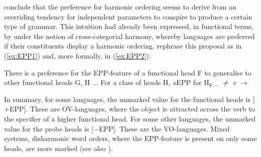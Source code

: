 \documentclass[output=paper]{langscibook}
\begin{document}
\citet{RobertsHolmberg2010} conclude that the preference for harmonic ordering seems to derive from an overriding tendency for independent parameters to conspire to produce a certain type of grammar. This intuition had already been expressed, in functional terms, by \citet{Hawkins1983} under the notion of cross-categorial harmony, whereby languages are preferred if their constituents display a harmonic ordering. \citet[39--40]{RobertsHolmberg2010} rephrase this proposal as in (\ref{ex:EPP1}) and, more formally, in (\ref{ex:EPP2}):
\begin{exe}
\ex \begin{xlist}
\ex There is a preference for the EPP-feature of a functional head F to generalise to other functional heads G, H ...\label{ex:EPP1}
\ex \label{ex:EPP2} For a class of heads H, \textit{u}EPP for H$_{\textrm{F}:-}$ $\neq$ \textit{v} $\rightarrow$ 
\end{xlist} 
\end{exe}
							    
\noindent In summary, for some languages, the unmarked value for the functional heads is [$+$EPP]. These are OV-languages, where the object is attracted across the verb to the specifier of a higher functional head. For some other languages, the unmarked value for the probe heads is [$-$EPP]. These are the VO-languages. Mixed systems, disharmonic word orders, where the EPP-feature is present on only some heads, are more marked (see also \citealt{BiberauerSheehan2013}).
\end{document}

